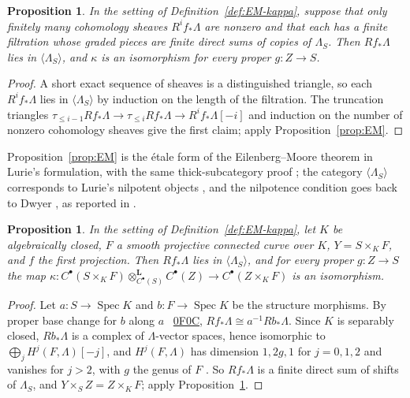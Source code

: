 \documentclass[11pt]{amsart}
\theoremstyle{plain}
\newtheorem{proposition}[theorem]{Proposition}
\theoremstyle{definition}
\theoremstyle{remark}
\numberwithin{equation}{section}
\newcommand{\stackstag}[1]{\cite[Tag~#1]{StacksProject}\,%
  \href{https://stacks.math.columbia.edu/tag/#1}{\textsf{#1}}}
\DeclareMathOperator{\Spec}{Spec}
\begin{document}
\begin{proposition}\label{prop:EM-criterion}
In the setting of Definition~\ref{def:EM-kappa}, suppose that only
finitely many cohomology sheaves $R^if_*\Lambda$ are nonzero and that
each has a finite filtration whose graded pieces are finite direct sums
of copies of $\Lambda_S$. Then $Rf_*\Lambda$ lies in
$\langle\Lambda_S\rangle$, and $\kappa$ is an isomorphism for every
proper $g:Z\to S$.
\end{proposition}

\begin{proof}
A short exact sequence of sheaves is a distinguished triangle, so each
$R^if_*\Lambda$ lies in $\langle\Lambda_S\rangle$ by induction on the
length of the filtration. The truncation triangles
$\tau_{\le i-1}Rf_*\Lambda\to\tau_{\le i}Rf_*\Lambda\to
R^if_*\Lambda[-i]$ and induction on the number of nonzero cohomology
sheaves give the first claim; apply Proposition~\ref{prop:EM}.
\end{proof}

Proposition~\ref{prop:EM} is the \'etale form of the Eilenberg--Moore
theorem in Lurie's formulation, with the same thick-subcategory proof
\cite[Proposition~1.1.9, p.~6, and Corollary~1.1.10, p.~7]%
{Lurie2011DAGXIII}; the category $\langle\Lambda_S\rangle$ corresponds
to Lurie's nilpotent objects \cite[Definition~1.1.7, p.~6]%
{Lurie2011DAGXIII}, and the nilpotence condition goes back to Dwyer
\cite{Dwyer1974StrongConvergence}, as reported in
\cite[Theorem~8\textsuperscript{bis}.30]{McCleary2001UsersGuide}.

\begin{proposition}\label{prop:EM-product}
In the setting of Definition~\ref{def:EM-kappa}, let $K$ be
algebraically closed, $F$ a smooth projective connected curve over $K$,
$Y=S\times_KF$, and $f$ the first projection. Then $Rf_*\Lambda$ lies in
$\langle\Lambda_S\rangle$, and for every proper $g:Z\to S$ the map
$\kappa:C^\bullet(S\times_KF)\otimes^{\mathbf L}_{C^\bullet(S)}
C^\bullet(Z)\to C^\bullet(Z\times_KF)$ is an isomorphism.
\end{proposition}

\begin{proof}
Let $a:S\to\Spec K$ and $b:F\to\Spec K$ be the structure morphisms. By
proper base change for $b$ along $a$ \stackstag{0F0C},
$Rf_*\Lambda\cong a^{-1}Rb_*\Lambda$. Since $K$ is separably closed,
$Rb_*\Lambda$ is a complex of $\Lambda$-vector spaces, hence isomorphic
to $\bigoplus_jH^j(F,\Lambda)[-j]$, and $H^j(F,\Lambda)$ has dimension
$1,2g,1$ for $j=0,1,2$ and vanishes for $j>2$, with $g$ the genus of
$F$ \cite[Proposition~14.2, p.~90]{MilneLEC2013}. So $Rf_*\Lambda$ is
a finite direct sum of shifts of $\Lambda_S$, and
$Y\times_SZ=Z\times_KF$; apply Proposition~\ref{prop:EM-criterion}.
\end{proof}
\end{document}
